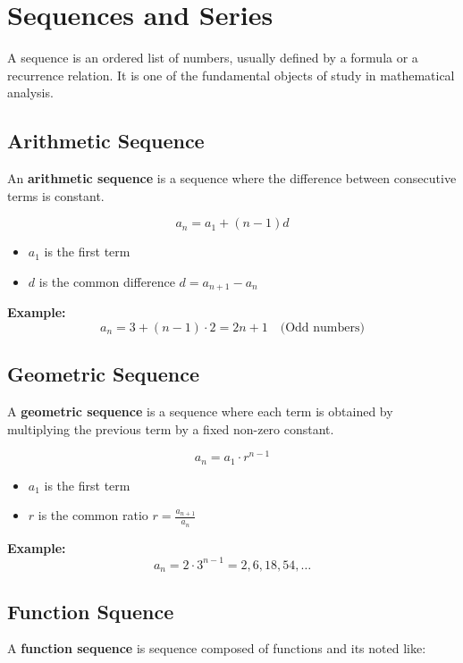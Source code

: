 \section{Sequences and Series}

A sequence is an ordered list of numbers, usually defined by a formula or a recurrence relation. It is one of the fundamental objects of study in mathematical analysis.

\subsection{Arithmetic Sequence}

An \textbf{arithmetic sequence} is a sequence where the difference between consecutive terms is constant.

\[
a_n = a_1 + (n - 1)d
\]

\begin{itemize}[label=\(-\)]
\item \(a_1\) is the first term
\item \(d\) is the common difference \(d = a_{n + 1} - a_{n}\)
\end{itemize}

\textbf{Example:}
\[
a_n = 3 + (n - 1) \cdot 2 = 2n + 1 \quad \text{(Odd numbers)}
\]

\subsection{Geometric Sequence}

A \textbf{geometric sequence} is a sequence where each term is obtained by multiplying the previous term by a fixed non-zero constant.

\[
a_n = a_1 \cdot r^{n-1}
\]

\begin{itemize}[label=\(-\)]
\item \(a_1\) is the first term
\item \(r\) is the common ratio \(r = \frac{a_{n + 1}}{a_n}\)
\end{itemize}

\textbf{Example:}
\[
a_n = 2 \cdot 3^{n-1} = 2, 6, 18, 54, \dots
\]

\subsection{Function Squence}

A \textbf{function sequence} is sequence composed of functions and its noted like:

